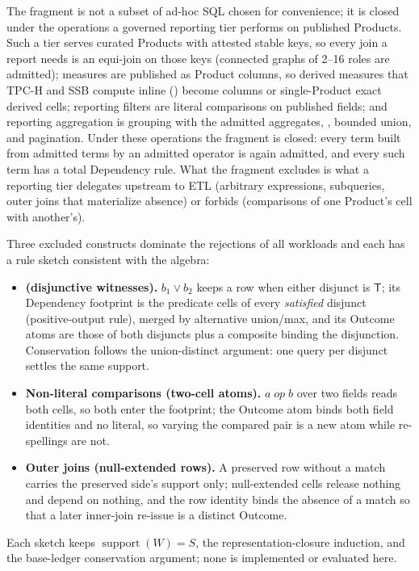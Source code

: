 \documentclass[journal,onecolumn]{IEEEtran}
\newcommand{\code}[1]{\texttt{\detokenize{#1}}}
\begin{document}
The fragment is not a subset of ad-hoc SQL chosen for convenience; it is
closed under the operations a governed reporting tier performs on published
Products. Such a tier serves curated Products with attested stable keys, so
every join a report needs is an equi-join on those keys (connected graphs of
2--16 roles are admitted); measures are published as Product columns, so
derived measures that TPC-H and SSB compute inline
(\code{lo_extendedprice * lo_discount}) become columns or single-Product
exact derived cells; reporting filters are literal comparisons on published
fields; and reporting aggregation is grouping with the admitted aggregates,
\code{HAVING}, bounded union, and pagination. Under these operations the
fragment is closed: every term built from admitted terms by an admitted
operator is again admitted, and every such term has a total Dependency rule.
What the fragment excludes is what a reporting tier delegates upstream to
ETL (arbitrary expressions, subqueries, outer joins that materialize absence)
or forbids (comparisons of one Product's cell with another's).

Three excluded constructs dominate the rejections of all workloads and each
has a rule sketch consistent with the algebra:
\begin{itemize}
\item \textbf{\code{OR} (disjunctive witnesses).} $b_1\vee b_2$ keeps a row
when either disjunct is $\mathsf T$; its Dependency footprint is the
predicate cells of every \emph{satisfied} disjunct (positive-output rule),
merged by alternative union/max, and its Outcome atoms are those of both
disjuncts plus a composite binding the disjunction. Conservation follows the
union-distinct argument: one query per disjunct settles the same support.
\item \textbf{Non-literal comparisons (two-cell atoms).} $a\;op\;b$ over two
fields reads both cells, so both enter the footprint; the Outcome atom binds
both field identities and no literal, so varying the compared pair is a new
atom while re-spellings are not.
\item \textbf{Outer joins (null-extended rows).} A preserved row without a
match carries the preserved side's support only; null-extended cells release
nothing and depend on nothing, and the row identity binds the absence of a
match so that a later inner-join re-issue is a distinct Outcome.
\end{itemize}
Each sketch keeps $\operatorname{support}(W)=S$, the representation-closure
induction, and the base-ledger conservation argument; none is implemented or
evaluated here.
\end{document}
